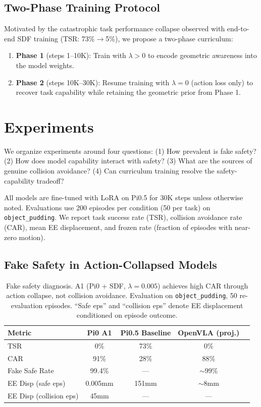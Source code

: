 \documentclass[letterpaper]{article}
\begin{document}
\subsection{Two-Phase Training Protocol}

Motivated by the catastrophic task performance collapse observed with end-to-end SDF training (TSR: 73\%$\to$5\%), we propose a two-phase curriculum:
\begin{enumerate}
    \item \textbf{Phase 1} (steps 1--10K): Train with $\lambda > 0$ to encode geometric awareness into the model weights.
    \item \textbf{Phase 2} (steps 10K--30K): Resume training with $\lambda = 0$ (action loss only) to recover task capability while retaining the geometric prior from Phase 1.
\end{enumerate}


\section{Experiments}

We organize experiments around four questions: (1) How prevalent is fake safety? (2) How does model capability interact with safety? (3) What are the sources of genuine collision avoidance? (4) Can curriculum training resolve the safety-capability tradeoff?

All models are fine-tuned with LoRA on Pi0.5 for 30K steps unless otherwise noted. Evaluations use 200 episodes per condition (50 per task) on \texttt{object\_pudding}. We report task success rate (TSR), collision avoidance rate (CAR), mean EE displacement, and frozen rate (fraction of episodes with near-zero motion).

\subsection{Fake Safety in Action-Collapsed Models}

\begin{table}[t]
\centering
\caption{Fake safety diagnosis. A1 (Pi0 + SDF, $\lambda=0.005$) achieves high CAR through action collapse, not collision avoidance. Evaluation on \texttt{object\_pudding}, 50 re-evaluation episodes. ``Safe eps'' and ``collision eps'' denote EE displacement conditioned on episode outcome.}
\label{tab:fake_safety}
\begin{tabular}{lcccc}
\toprule
\textbf{Metric} & \textbf{Pi0 A1} & \textbf{Pi0.5 Baseline} & \textbf{OpenVLA (proj.)} \\
\midrule
TSR & 0\% & 73\% & 0\% \\
CAR & 91\% & 28\% & 88\% \\
Fake Safe Rate & 99.4\% & --- & $\sim$99\% \\
EE Disp (safe eps) & 0.005mm & 151mm & $\sim$8mm \\
EE Disp (collision eps) & 45mm & --- & --- \\
\bottomrule
\end{tabular}
\end{table}
\end{document}
